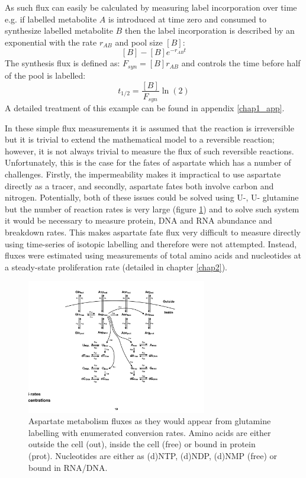 As such flux can easily be calculated by measuring label incorporation over time e.g. if labelled metabolite $A$ is introduced at time zero and consumed to synthesize labelled metabolite $B$ then the label incorporation is described by an exponential with the rate $r_{AB}$ and pool size $[B]$:
$$
[B] - [B] e^{-r_{AB} t}
$$
The synthesis flux is defined as: $F_{syn} = [B] r_{AB}$ and controls the time before half of the pool is labelled:
$$
t_{1/2} = \frac{[B]}{F_{syn}} \ln(2)
$$
A detailed treatment of this example can be found in appendix \ref{chap1_app}.

In these simple flux measurements it is assumed that the reaction is irreversible but it is trivial to extend the mathematical model to a reversible reaction; however, it is not always trivial to measure the flux of such reversible reactions.
Unfortunately, this is the case for the fates of aspartate which has a number of challenges.
Firstly, the impermeability makes it impractical to use aspartate directly as a tracer, and secondly, aspartate fates both involve carbon and nitrogen.
Potentially, both of these issues could be solved using U-\hCi{}, U-\hNi{} glutamine but the number of reaction rates is very large (figure \ref{fig:ch1:asp_fluxes}) and to solve such system it would be necessary to measure protein, DNA and RNA abundance and breakdown rates.
This makes aspartate fate flux very difficult to measure directly using time-series of isotopic labelling and therefore were not attempted.
Instead, fluxes were estimated using measurements of total amino acids and nucleotides at a steady-state proliferation rate (detailed in chapter \ref{chap2}).

\begin{figure}
    \centering
    \includegraphics[width=0.70\textwidth]{figures/chap1/asp_fluxes.pdf}
    \caption[Aspartate metabolism fluxes]{
    Aspartate metabolism fluxes as they would appear from glutamine labelling with enumerated conversion rates.
    Amino acids are either outside the cell (out), inside the cell (free) or bound in protein (prot).
    Nucleotides are either as (d)NTP, (d)NDP, (d)NMP (free) or bound in RNA/DNA.
    }
    \label{fig:ch1:asp_fluxes}
\end{figure}





